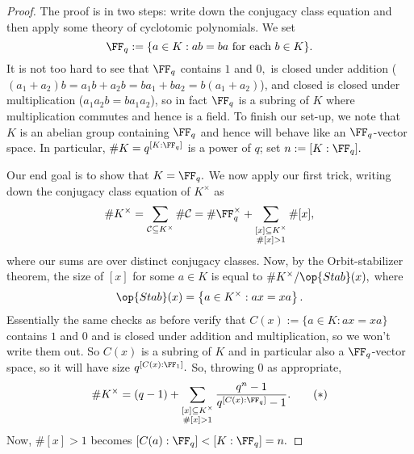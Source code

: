 \begin{proof}
	The proof is in two steps: write down the conjugacy class equation and then apply some theory of cyclotomic polynomials.
	We set
	\[\FF_q:=\{a\in K:ab=ba\text{ for each }b\in K\}.\]
	It is not too hard to see that $\FF_q$ contains $1$ and $0,$ is closed under addition ($(a_1+a_2)b=a_1b+a_2b=ba_1+ba_2=b(a_1+a_2)$), and closed is closed under multiplication ($a_1a_2b=ba_1a_2$), so in fact $\FF_q$ is a subring of $K$ where multiplication commutes and hence is a field. To finish our set-up, we note that $K$ is an abelian group containing $\FF_q$ and hence will behave like an $\FF_q$-vector space. In particular, $\#K=q^{[K:\FF_q]}$ is a power of $q$; set $n:=[K:\FF_q].$

	Our end goal is to show that $K=\FF_q.$ We now apply our first trick, writing down the conjugacy class equation of $K^\times$ as
	\[\#K^\times=\sum_{\mathcal C\subseteq K^\times}\#\mathcal C=\#\FF_q^\times+\sum_{\substack{[x]\subseteq K^\times\\\#[x]>1}}\#[x],\]
	where our sums are over distinct conjugacy classes. Now, by the Orbit-stabilizer theorem, the size of $[x]$ for some $a\in K$ is equal to $\#K^\times/\op{Stab}(x),$ where
	\[\op{Stab}(x)=\left\{a\in K^\times:ax=xa\right\}.\]
	Essentially the same checks as before verify that $C(x):=\{a\in K:ax=xa\}$ contains $1$ and $0$ and is closed under addition and multiplication, so we won't write them out. So $C(x)$ is a subring of $K$ and in particular also a $\FF_q$-vector space, so it will have size $q^{[C(x):\FF_1]}.$ So, throwing $0$ as appropriate,
	\[\#K^\times=(q-1)+\sum_{\substack{[x]\subseteq K^\times\\\#[x]>1}}\frac{q^n-1}{q^{[C(x):\FF_q]}-1}.\tag{$*$}\]
	Now, $\#[x]>1$ becomes $[C(a):\FF_q]<[K:\FF_q]=n.$


\end{proof}
